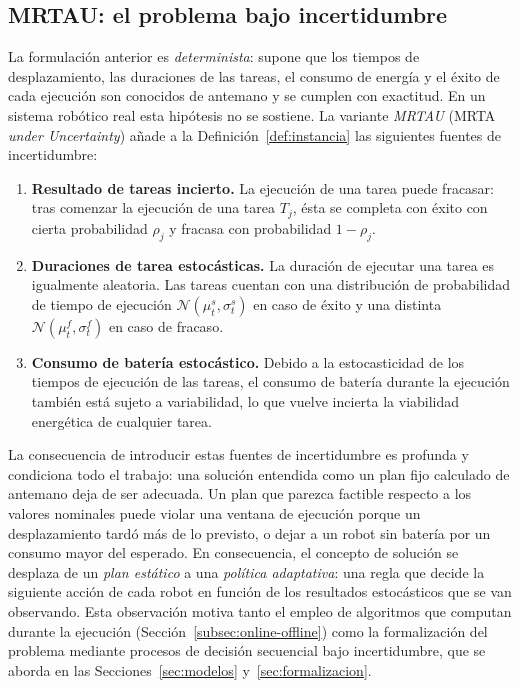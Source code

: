\subsection{MRTAU: el problema bajo incertidumbre} \label{subsec:mrtau} %

La formulación anterior es \emph{determinista}: supone que los tiempos de desplazamiento, las duraciones de las tareas, el consumo de energía y el éxito de cada ejecución son conocidos de antemano y se cumplen con exactitud. En un sistema robótico real esta hipótesis no se sostiene. La variante \emph{MRTAU} (MRTA \textit{under Uncertainty}) añade a la Definición~\ref{def:instancia} las siguientes fuentes de incertidumbre:

\begin{enumerate}  
    \item \textbf{Resultado de tareas incierto.} La ejecución de una tarea puede fracasar: tras comenzar la ejecución de una tarea $T_j$, ésta se completa con éxito con cierta probabilidad $\rho_j$ y fracasa con probabilidad $1-\rho_j$. 
    
    \item \textbf{Duraciones de tarea estocásticas.} La duración de ejecutar una tarea es igualmente aleatoria. Las tareas cuentan con una distribución de probabilidad de tiempo de ejecución $\mathcal{N}(\mu_t^s, \sigma_t^s)$ en caso de éxito y una distinta $\mathcal{N}(\mu_t^f, \sigma_t^f)$ en caso de fracaso.
      
    \item \textbf{Consumo de batería estocástico.} Debido a la estocasticidad de los tiempos de ejecución de las tareas, el consumo de batería durante la ejecución también está sujeto a variabilidad, lo que vuelve incierta la viabilidad energética de cualquier tarea. \end{enumerate}

La consecuencia de introducir estas fuentes de incertidumbre es profunda y condiciona todo el trabajo: una solución entendida como un plan fijo calculado de antemano deja de ser adecuada. Un plan que parezca factible respecto a los valores nominales puede violar una ventana de ejecución porque un desplazamiento tardó más de lo previsto, o dejar a un robot sin batería por un consumo mayor del esperado. En consecuencia, el concepto de solución se desplaza de un \emph{plan estático} a una \emph{política adaptativa}: una regla que decide la siguiente acción de cada robot en función de los resultados estocásticos que se van observando. Esta observación motiva tanto el empleo de algoritmos que computan durante la ejecución (Sección~\ref{subsec:online-offline}) como la formalización del problema mediante procesos de decisión secuencial bajo incertidumbre, que se aborda en las Secciones~\ref{sec:modelos} y~\ref{sec:formalizacion}.

